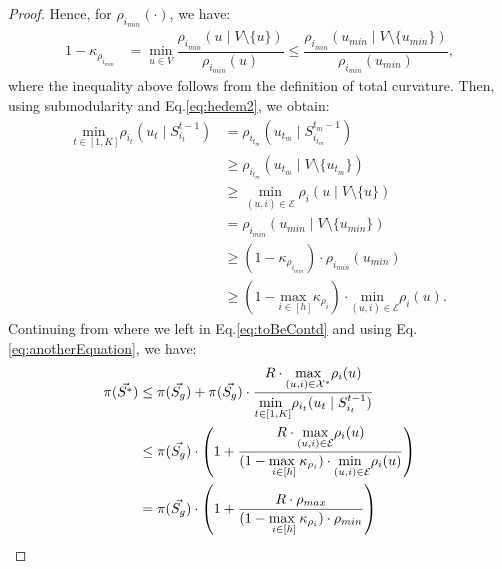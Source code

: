 \begin{proof}
Hence, for $\rho_{i_{min}}(\cdot)$, we have:
\begin{align} \label{eq:hedem2}
1 -  \kappa_{\rho_{i_{min}}} &= \underset{u \in V} {\min} \dfrac{\rho_{i_{min}}(u \mid V\setminus \{u\})}{\rho_{i_{min}}(u)} \le \dfrac{\rho_{i_{min}}(u_{min} \mid V \setminus \{u_{min}\})}{\rho_{i_{min}}(u_{min})},
\end{align}
where the inequality above follows from the definition of total curvature. Then, using submodularity and Eq.\ref{eq:hedem2}, we obtain:
\begin{align}
\label{eq:anotherEquation}
\underset{t \in [1,K]} {\text{min }} \rho_{i_t}(u_t \mid S_{i_t}^{t-1}) &= \rho_{i_{t_m}}(u_{t_m} \mid S_{i_{t_m}}^{t_m - 1}) \nonumber \\
&\ge \rho_{i_{t_m}}(u_{t_m} \mid V \setminus \{u_{t_m}\}) \nonumber \\
&\ge \underset{(u,i) \in \mathcal{E}} {\min} \rho_i(u \mid V \setminus \{u\}) \nonumber \\
&= \rho_{i_{min}}(u_{min} \mid V \setminus \{u_{min}\}) \nonumber \\
&\ge (1 -  \kappa_{\rho_{i_{min}}}) \cdot {\rho_{i_{min}}(u_{min})} \nonumber \\
&\ge (1 - \underset{i \in [h]} {\text{max }} {\kappa_{\rho_{i}}}) \cdot  \underset{(u,i) \in \mathcal{E}} {\text{min }} {\rho_{i}(u)}.
\end{align}
Continuing from where we left in Eq.\ref{eq:toBeContd} and using Eq.\ref{eq:anotherEquation}, we have:
\begin{align}
\label{eq:garantiFinal}
\pi(\vec{S^*}) &\le \pi(\vecalloc) + \pi(\vecalloc) \cdot \dfrac{R \cdot \underset{(u,i) \in \mathcal{X}^*} {\max} \rho_i(u)  }{\underset{t \in [1,K]} {\text{min }} \rho_{i_t}(u_t \mid S_{i_t}^{t-1})} \nonumber \\
&\le \pi(\vecalloc) \cdot \left( 1+  \dfrac{R \cdot \underset{(u,i) \in \mathcal{E}} {\max} \rho_i(u) }{ (1 - \underset{i \in [h]} {\text{max }} {\kappa_{\rho_{i}}}) \cdot  \underset{(u,i) \in \mathcal{E}} {\text{min }} {\rho_{i}(u)} }  \right) \nonumber \\
&= \pi(\vecalloc) \cdot \left( 1+  \dfrac{R \cdot \rho_{max} }{ (1 - \underset{i \in [h]} {\text{max }} {\kappa_{\rho_{i}}}) \cdot \rho_{min} }  \right)

\end{align}
\end{proof}
